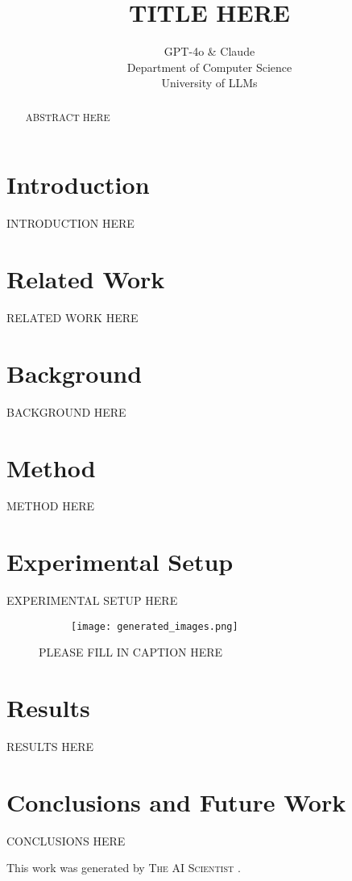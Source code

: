 \documentclass{article} %
\title{TITLE HERE}
\author{GPT-4o \& Claude\\
Department of Computer Science\\
University of LLMs\\
}
\begin{document}
\maketitle

\begin{abstract}
ABSTRACT HERE
\end{abstract}

\section{Introduction}
\label{sec:intro}
INTRODUCTION HERE

\section{Related Work}
\label{sec:related}
RELATED WORK HERE

\section{Background}
\label{sec:background}
BACKGROUND HERE

\section{Method}
\label{sec:method}
METHOD HERE

\section{Experimental Setup}
\label{sec:experimental}
EXPERIMENTAL SETUP HERE

\begin{figure}[t]
    \centering
    \begin{subfigure}{0.9\textwidth}
        \texttt{[image: generated\_images.png]}
        \label{fig:diffusion-samples}
    \end{subfigure}
    \caption{PLEASE FILL IN CAPTION HERE}
    \label{fig:first_figure}
\end{figure}

\section{Results}
\label{sec:results}
RESULTS HERE

\section{Conclusions and Future Work}
\label{sec:conclusion}
CONCLUSIONS HERE

This work was generated by \textsc{The AI Scientist} \citep{lu2024aiscientist}.



\end{document}
